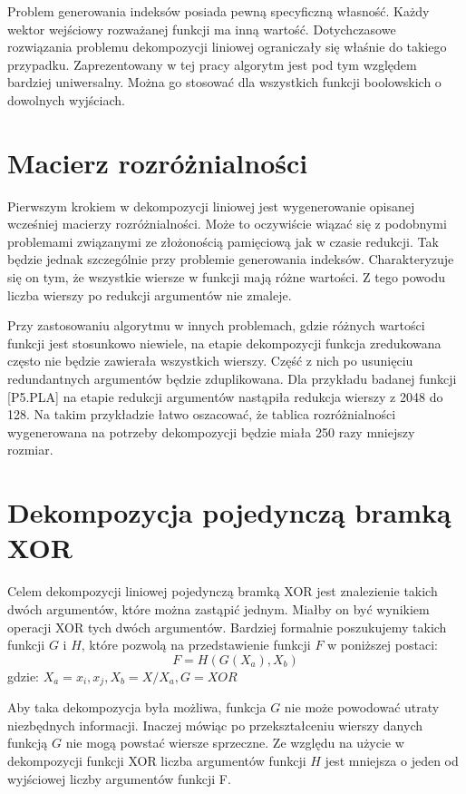 Problem generowania indeksów posiada pewną specyficzną własność.
Każdy wektor wejściowy rozważanej funkcji ma inną wartość.
Dotychczasowe rozwiązania problemu dekompozycji liniowej ograniczały się właśnie do takiego przypadku.
Zaprezentowany w tej pracy algorytm jest pod tym względem bardziej uniwersalny.
Można go stosować dla wszystkich funkcji boolowskich o dowolnych wyjściach.

\section{Macierz rozróżnialności}

Pierwszym krokiem w dekompozycji liniowej jest wygenerowanie opisanej wcześniej macierzy rozróżnialności.
Może to oczywiście wiązać się z podobnymi problemami związanymi ze złożonością pamięciową jak w czasie redukcji.
Tak będzie jednak szczególnie przy problemie generowania indeksów.
Charakteryzuje się on tym,
że wszystkie wiersze w funkcji mają różne wartości.
Z tego powodu liczba wierszy po redukcji argumentów nie zmaleje.

Przy zastosowaniu algorytmu w innych problemach,
gdzie różnych wartości funkcji jest stosunkowo niewiele,
na etapie dekompozycji funkcja zredukowana często nie będzie zawierała wszystkich wierszy.
Część z nich po usunięciu redundantnych argumentów będzie zduplikowana.
Dla przykładu badanej funkcji [P5.PLA] na etapie redukcji argumentów nastąpiła redukcja wierszy z 2048 do 128.
Na takim przykładzie łatwo oszacować,
że tablica rozróżnialności wygenerowana na potrzeby dekompozycji będzie miała 250 razy mniejszy rozmiar.

\section{Dekompozycja pojedynczą bramką XOR}

Celem dekompozycji liniowej pojedynczą bramką XOR jest znalezienie takich dwóch argumentów,
które można zastąpić jednym.
Miałby on być wynikiem operacji XOR tych dwóch argumentów.
Bardziej formalnie poszukujemy takich funkcji $G$ i $H$,
które pozwolą na przedstawienie funkcji $F$ w poniższej postaci:
\begin{equation}
F = H( G ( X_a ), X_b)
\end{equation}
gdzie: $X_a = {x_i, x_j}, X_b = X / X_a, G = XOR$

Aby taka dekompozycja była możliwa,
funkcja $G$ nie może powodować utraty niezbędnych informacji.
Inaczej mówiąc po przekształceniu wierszy danych funkcją $G$ nie mogą powstać wiersze sprzeczne.
Ze względu na użycie w dekompozycji funkcji XOR liczba argumentów funkcji $H$ jest mniejsza o jeden od wyjściowej liczby argumentów funkcji F.

